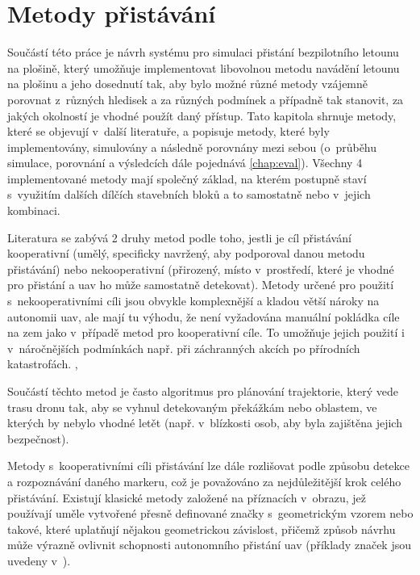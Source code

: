 \chapter{Metody přistávání} \label{chap:algs}
    Součástí této práce je návrh systému pro simulaci přistání bezpilotního letounu na plošině, který umožňuje implementovat libovolnou metodu navádění letounu na plošinu a jeho dosednutí tak, aby bylo možné různé metody vzájemně porovnat z~různých hledisek a za různých podmínek a případně tak stanovit, za jakých okolností je vhodné použít daný přístup. Tato kapitola shrnuje metody, které se objevují v~další literatuře, a popisuje metody, které byly implementovány, simulovány a následně porovnány mezi sebou (o~průběhu simulace, porovnání a výsledcích dále pojednává \cref{chap:eval}). Všechny 4 implementované metody mají společný základ, na kterém postupně staví s~využitím dalších dílčích stavebních bloků a to samostatně nebo v~jejich kombinaci.

    Literatura se zabývá 2 druhy metod podle toho, jestli je cíl přistávání kooperativní (umělý, specificky navržený, aby podporoval danou metodu přistávání) nebo nekooperativní (přirozený, místo v~prostředí, které je vhodné pro přistání a \acrshort{uav} ho může samostatně detekovat). Metody určené pro použití s~nekooperativními cíli jsou obvykle komplexnější a kladou větší nároky na autonomii \acrshort{uav}, ale mají tu výhodu, že není vyžadována manuální pokládka cíle na zem jako v~případě metod pro kooperativní cíle. To umožňuje jejich použití i v~náročnějších podmínkách např. při záchranných akcích po přírodních katastrofách. \cite{Xin2022}, \cite{Kakaletsis2022}

    Součástí těchto metod je často algoritmus pro plánování trajektorie, který vede trasu dronu tak, aby se vyhnul detekovaným překážkám nebo oblastem, ve kterých by nebylo vhodné letět (např. v~blízkosti osob, aby byla zajištěna jejich bezpečnost). \cite{Kakaletsis2022}

    Metody s~kooperativními cíli přistávání lze dále rozlišovat podle způsobu detekce a rozpoznávání daného markeru, což je považováno za nejdůležitější krok celého přistávání. Existují klasické metody založené na příznacích v~obrazu, jež používají uměle vytvořené přesně definované značky s~geometrickým vzorem nebo takové, které uplatňují nějakou geometrickou závislost, přičemž způsob návrhu může výrazně ovlivnit schopnosti autonomního přistání \acrshort{uav} (příklady značek jsou uvedeny v~). \cite{Xin2022}

